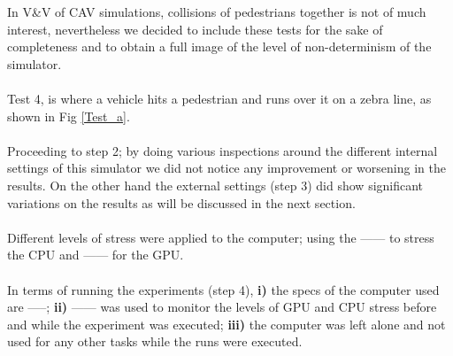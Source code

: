In V\&V of CAV simulations, collisions of pedestrians together is not of much interest, nevertheless we decided to include these tests for the sake of completeness and to obtain a full image of the level of non-determinism of the simulator.\\\\
Test 4, is where a vehicle hits a pedestrian and runs over it on a zebra line, as shown in Fig \ref{Test_a}.\\\\
Proceeding to step 2; by doing various inspections around the different internal settings of this simulator we did not notice any improvement or worsening in the results. 
On the other hand the external settings (step 3) did show significant variations on the results as will be discussed in the next section. \\\\
Different levels of stress were applied to the computer; using the ------ to stress the CPU and ------ for the GPU.\\\\ 
In terms of running the experiments (step 4), \textbf{i)} the specs of the computer used are -----; \textbf{ii)} ------ was used to monitor the levels of GPU and CPU stress before and while the experiment was executed; \textbf{iii)} the computer was left alone and not used for any other tasks while the runs were executed.

